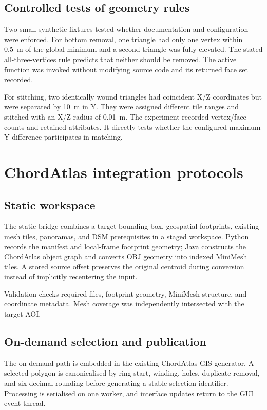\subsection{Controlled tests of geometry rules}

Two small synthetic fixtures tested whether documentation and configuration
were enforced.  For bottom removal, one triangle had only one vertex within
\SI{0.5}{\metre} of the global minimum and a second triangle was fully elevated.
The stated all-three-vertices rule predicts that neither should be removed.  The
active function was invoked without modifying source code and its returned
face set recorded.

For stitching, two identically wound triangles had coincident X/Z coordinates
but were separated by \SI{10}{\metre} in Y.  They were assigned different tile
ranges and stitched with an X/Z radius of \SI{0.01}{\metre}.  The experiment
recorded vertex/face counts and retained attributes.  It directly tests whether
the configured maximum Y difference participates in matching.

\section{ChordAtlas integration protocols}

\subsection{Static workspace}

The static bridge combines a target bounding box, geospatial footprints,
existing mesh tiles, panoramas, and DSM prerequisites in a staged workspace.
Python records the manifest and local-frame footprint geometry; Java constructs
the ChordAtlas object graph and converts OBJ geometry into indexed MiniMesh
tiles.  A stored source offset preserves the original centroid during
conversion instead of implicitly recentering the input.

Validation checks required files, footprint geometry, MiniMesh structure, and
coordinate metadata.  Mesh coverage was independently intersected with the
target AOI. 

\subsection{On-demand selection and publication}

The on-demand path is embedded in the existing ChordAtlas GIS generator.  A
selected polygon is canonicalised by
ring start, winding, holes, duplicate removal, and six-decimal rounding before
generating a stable selection identifier.  Processing is serialised on one
worker, and interface updates return to the GUI event thread.

